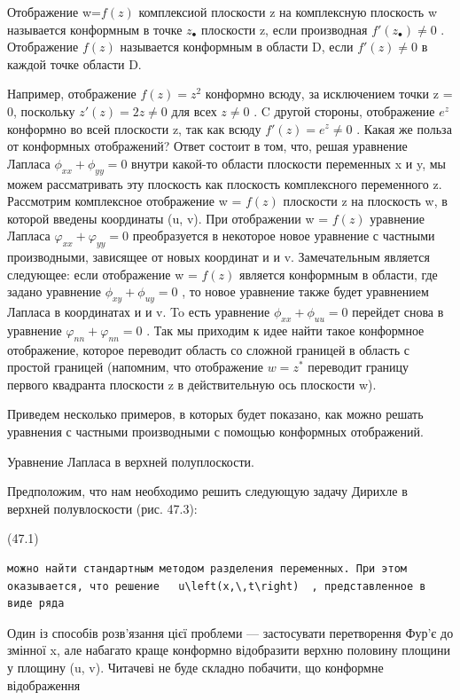 \documentclass[
  ukrainian,
]{article}
\begin{document}
Отображение w=\(f(z)\) комплексиой плоскости z на комплексную плоскость
w называется конформным в точке \(z_{\bullet}\) плоскости z, если
производная \(f'(z_{\bullet}) \neq 0\) . Отображение \(f(z)\) называется
конформным в области D, если \(f'(z) \neq 0\) в каждой точке области D.

Например, отображение \(f(z) = z^2\) конформно всюду, за исключением
точки z = 0, поскольку \(z'(z) = 2z \neq 0\) для всех \(z \neq 0\) . C
другой стороны, отображение \(e^z\) конформно во всей плоскости z, так
как всюду \(f'(z) = e^z \neq 0\) . Какая же польза от конформных
отображений? Ответ состоит в том, что, решая уравнение Лапласа
\(\phi_{xx} + \phi_{yy} = 0\) внутри какой-то области плоскости
переменных x и y, мы можем рассматривать эту плоскость как плоскость
комплексного переменного z. Рассмотрим комплексное отображение w =
\(f(z)\) плоскости z на плоскость w, в которой введены координаты (u,
v). При отображении w = \(f(z)\) уравнение Лапласа
\(\varphi_{xx} + \varphi_{yy} = 0\) преобразуется в некоторое новое
уравнение с частными производными, зависящее от новых координат и и v.
Замечательным является следующее: если отображение w = \(f(z)\) является
конформным в области, где задано уравнение \(\phi_{xy} + \phi_{uy} = 0\)
, то новое уравнение также будет уравнением Лапласа в координатах и и v.
To есть уравнение \(\phi_{xx} + \phi_{uu} = 0\) перейдет снова в
уравнение \(\varphi_{nn} + \varphi_{nn} = 0\) . Так мы приходим к идее
найти такое конформное отображение, которое переводит область со сложной
границей в область с простой границей (напомним, что отображение
\(w=z^*\) переводит границу первого квадранта плоскости z в
действительную ось плоскости w).

Приведем несколько примеров, в которых будет показано, как можно решать
уравнения с частными производными с помощью конформных отображений.

Уравнение Лапласа в верхней полуплоскости.

Предположим, что нам необходимо решить следующую задачу Дирихле в
верхней полувлоскости (рис. 47.3):

(47.1)

\begin{verbatim}
можно найти стандартным методом разделения переменных. При этом оказывается, что решение   u\left(x,\,t\right)  , представленное в виде ряда
\end{verbatim}

Один із способів розв'язання цієї проблеми --- застосувати перетворення
Фур'є до змінної x, але набагато краще конформно відобразити верхню
половину площини у площину (u, v). Читачеві не буде складно побачити, що
конформне відображення
\end{document}
